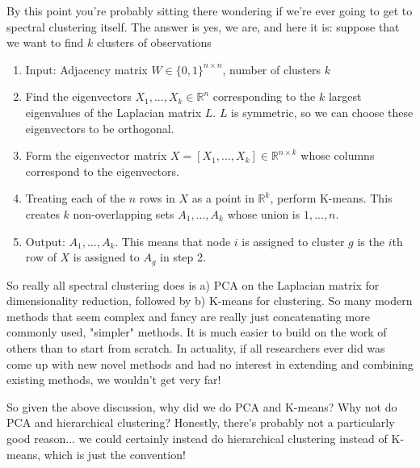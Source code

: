 By this point you're probably sitting there wondering if we're ever going to get to spectral clustering itself. The answer is yes, we are, and here it is: suppose that we want to find $k$ clusters of observations


\begin{enumerate}
\item Input: Adjacency matrix $W \in \{0, 1\}^{n \times n}$, number of clusters $k$
\item Find the eigenvectors $X_1, ..., X_k \in \mathbb{R}^n$ corresponding to the $k$ largest eigenvalues of the Laplacian matrix $L$. $L$ is symmetric, so we can choose these eigenvectors to be orthogonal.
\item Form the eigenvector matrix $X = [X_1, ..., X_k] \in \mathbb{R}^{n \times k}$ whose columns correspond to the eigenvectors.
\item Treating each of the $n$ rows in $X$ as a point in $\mathbb{R}^k$, perform K-means. This creates $k$ non-overlapping sets $A_1, ..., A_k$ whose union is $1, ..., n$.
\item Output: $A_1, ..., A_k$. This means that node $i$ is assigned to cluster $g$ is the $i$th row of $X$ is assigned to $A_g$ in step 2.
\end{enumerate}




So really all spectral clustering does is a) PCA on the Laplacian matrix for dimensionality reduction, followed by b) K-means for clustering. So many modern methods that seem complex and fancy are really just concatenating more commonly used, "simpler" methods. It is much easier to build on the work of others than to start from scratch. In actuality, if all researchers ever did was come up with new novel methods and had no interest in extending and combining existing methods, we wouldn't get very far!

So given the above discussion, why did we do PCA and K-means? Why not do PCA and hierarchical clustering? Honestly, there's probably not a particularly good reason... we could certainly instead do hierarchical clustering instead of K-means, which is just the convention!


